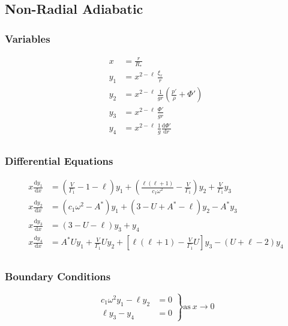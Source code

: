 \documentclass[fleqn]{article}
\newcommand{\diff}{\ensuremath{\mathrm{d}}}
\newcommand{\Vg}{\ensuremath{\frac{V}{\Gamma_{1}}}}
\newcommand{\As}{\ensuremath{A^{\ast}}}
\newcommand{\Rstar}{\ensuremath{R_{\ast}}}
\begin{document}

\newpage

\subsection*{Non-Radial Adiabatic}

\subsubsection*{Variables}

\begin{align*}
x     &= \frac{r}{\Rstar} \\
y_{1} &= x^{2-\ell}\, \frac{\xi_{r}}{r} \\
y_{2} &= x^{2-\ell}\, \frac{1}{gr} \left( \frac{p'}{\rho} + \Phi' \right) \\
y_{3} &= x^{2-\ell}\, \frac{\Phi'}{gr} \\
y_{4} &= x^{2-\ell}\, \frac{1}{g} \frac{\diff \Phi'}{\diff r} \\
\end{align*}

\subsubsection*{Differential Equations}

\begin{align*}
x \frac{\diff y_{1}}{\diff x} &=
\left(\Vg - 1 - \ell \right) y_{1} +
\left(\frac{\ell(\ell+1)}{c_{1} \omega^{2}} - \Vg \right) y_{2} +
\Vg y_{3} \\
x \frac{\diff y_{2}}{\diff x} &=
(c_{1} \omega^{2} - \As ) y_{1} +
(3 - U + \As - \ell) y_{2} -
\As y_{3} \\
x \frac{\diff y_{3}}{\diff x} &=
(3 - U - \ell) y_{3} +
y_{4} \\
x \frac{\diff y_{4}}{\diff x} &=
\As U y_{1} +
\Vg U y_{2} +
\left[ \ell(\ell+1) - \Vg U \right] y_{3} -
(U + \ell - 2) y_{4} \\
\end{align*}

\subsubsection*{Boundary Conditions}

\begin{equation*}
\left.
\begin{aligned}
c_{1} \omega^{2} y_{1} - \ell y_{2} &= 0 \\
\ell y_{3} - y_{4} &= 0
\end{aligned}
\right\}
\text{as}\ x \rightarrow 0
\end{equation*}
\end{document}
